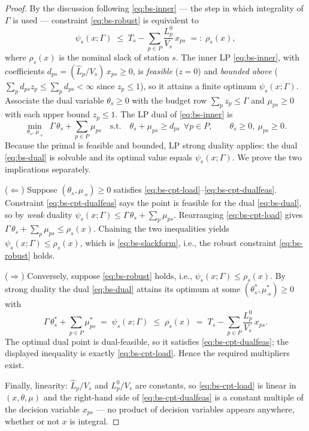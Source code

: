 \begin{proof}
By the discussion following \eqref{eq:bs-inner} --- the step in which
integrality of $\Gamma$ is used --- constraint
\eqref{eq:bs-robust} is equivalent to
\begin{equation}
\psi_s(x;\Gamma) \;\le\; T_s - \sum_{p \in P} \frac{L^0_p}{V_s}\, x_{ps}
\;=:\; \rho_s(x),
\label{eq:bs-slackform}
\end{equation}
where $\rho_s(x)$ is the nominal slack of station $s$. The inner LP
\eqref{eq:bs-inner}, with coefficients
$d_{ps} = (\hat L_p / V_s)\, x_{ps} \ge 0$, is \emph{feasible} ($z = 0$) and
\emph{bounded above} ($\sum_p d_{ps} z_p \le \sum_p d_{ps} < \infty$ since
$z_p \le 1$), so it attains a finite optimum $\psi_s(x;\Gamma)$. Associate
the dual variable $\theta_s \ge 0$ with the budget row
$\sum_p z_p \le \Gamma$ and $\mu_{ps} \ge 0$ with each upper bound
$z_p \le 1$. The LP dual of \eqref{eq:bs-inner} is
\begin{equation}
\min_{\theta_s,\, \mu_{\cdot s}} \;\; \Gamma\,\theta_s + \sum_{p \in P} \mu_{ps}
\quad \text{s.t.} \quad
\theta_s + \mu_{ps} \ge d_{ps} \ \ \forall p \in P, \qquad
\theta_s \ge 0,\ \mu_{ps} \ge 0.
\label{eq:bs-dual}
\end{equation}
Because the primal is feasible and bounded, LP strong duality applies: the
dual \eqref{eq:bs-dual} is solvable and its optimal value equals
$\psi_s(x;\Gamma)$. We prove the two implications separately.

($\Leftarrow$) Suppose $(\theta_s, \mu_{\cdot s}) \ge 0$ satisfies
\eqref{eq:bs-cpt-load}--\eqref{eq:bs-cpt-dualfeas}. Constraint
\eqref{eq:bs-cpt-dualfeas} says the point is feasible for the dual
\eqref{eq:bs-dual}, so by \emph{weak} duality
$\psi_s(x;\Gamma) \le \Gamma\,\theta_s + \sum_p \mu_{ps}$. Rearranging
\eqref{eq:bs-cpt-load} gives
$\Gamma\,\theta_s + \sum_p \mu_{ps} \le \rho_s(x)$. Chaining the two
inequalities yields $\psi_s(x;\Gamma) \le \rho_s(x)$, which is
\eqref{eq:bs-slackform}, i.e., the robust constraint \eqref{eq:bs-robust}
holds.

($\Rightarrow$) Conversely, suppose \eqref{eq:bs-robust} holds, i.e.,
$\psi_s(x;\Gamma) \le \rho_s(x)$. By strong duality the dual
\eqref{eq:bs-dual} attains its optimum at some
$(\theta_s^\ast, \mu_{\cdot s}^\ast) \ge 0$ with
\[
\Gamma\,\theta_s^\ast + \sum_{p \in P} \mu_{ps}^\ast
\;=\; \psi_s(x;\Gamma) \;\le\; \rho_s(x)
\;=\; T_s - \sum_{p \in P} \frac{L^0_p}{V_s}\, x_{ps}.
\]
The optimal dual point is dual-feasible, so it satisfies
\eqref{eq:bs-cpt-dualfeas}; the displayed inequality is exactly
\eqref{eq:bs-cpt-load}. Hence the required multipliers exist.

Finally, linearity: $\hat L_p/V_s$ and $L^0_p/V_s$ are constants, so
\eqref{eq:bs-cpt-load} is linear in $(x,\theta,\mu)$ and the right-hand side
of \eqref{eq:bs-cpt-dualfeas} is a constant multiple of the decision variable
$x_{ps}$ --- no product of decision variables appears anywhere, whether or
not $x$ is integral.
\end{proof}

